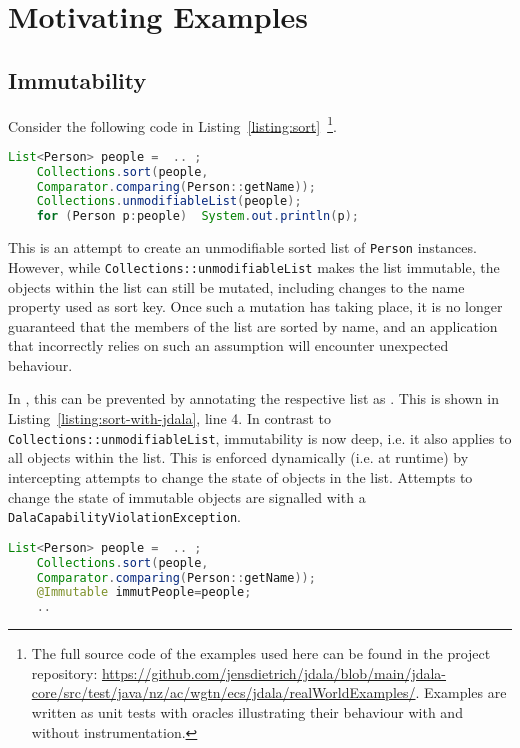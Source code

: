 \section{Motivating Examples}

\subsection{Immutability}	


Consider the following code in Listing~\ref{listing:sort}~\footnote{The full source code of the examples used here can be found in the project repository: \url{https://github.com/jensdietrich/jdala/blob/main/jdala-core/src/test/java/nz/ac/wgtn/ecs/jdala/realWorldExamples/}. Examples are written as unit tests with oracles illustrating their behaviour with and without \jdala instrumentation.}.

\begin{lstlisting}[language=Java, caption=Erroneous Attempt to Make a Sorted List Immutable, label=listing:sort]
	List<Person> people =  .. ;
	Collections.sort(people,
	Comparator.comparing(Person::getName));
	Collections.unmodifiableList(people);
	for (Person p:people)  System.out.println(p);
\end{lstlisting}

This is an attempt to create an unmodifiable sorted list of \texttt{Person} instances. 
However, while \texttt{Collections::unmodifiableList} makes the list immutable, the objects within the list can still be mutated, including changes to the name property used as sort key.  Once such a mutation 
has taking place, it is no longer guaranteed that the members of the list are sorted by name, and an application that incorrectly relies on such an assumption will encounter unexpected behaviour.

In \jdala ,  this can be prevented by annotating the respective list as \Immutable. This is shown in Listing~\ref{listing:sort-with-jdala}, line 4. In contrast to \texttt{Collections::unmodifiableList}, immutability is now deep, i.e. it also applies to all objects within the list. This is enforced dynamically (i.e. at runtime) by intercepting attempts to change the state of objects in the list.  Attempts to change the state of immutable objects are signalled with a \texttt{DalaCapabilityViolationException}. 

\begin{lstlisting}[language=Java, caption=Make a Sorted List Immutable with \jdala, label=listing:sort-with-jdala]
	List<Person> people =  .. ;
	Collections.sort(people,
	Comparator.comparing(Person::getName));
	@Immutable immutPeople=people;
	..
\end{lstlisting}


